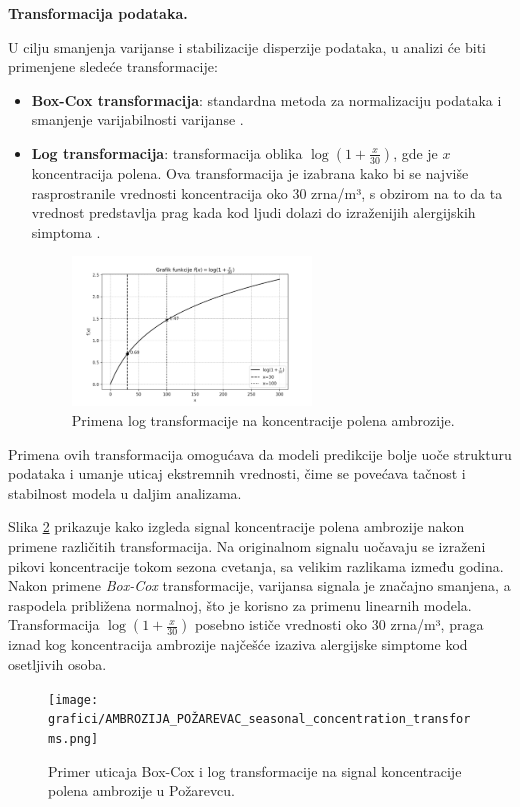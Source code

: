 \documentclass[12pt]{article}
\begin{document}
\bigskip

\textbf{Transformacija podataka.}

U cilju smanjenja varijanse i stabilizacije disperzije podataka, u analizi će biti primenjene sledeće transformacije:

\begin{itemize}
    \item \textbf{Box-Cox transformacija}: standardna metoda za normalizaciju podataka i smanjenje varijabilnosti varijanse \cite{boxcox1964}.
    \item \textbf{Log transformacija}: transformacija oblika $\log(1 + \frac{x}{30})$, gde je $x$ koncentracija polena. Ova transformacija je izabrana kako bi se najviše rasprostranile vrednosti koncentracija oko 30 zrna/m³, s obzirom na to da ta vrednost predstavlja prag kada kod ljudi dolazi do izraženijih alergijskih simptoma \cite{damato2007}.
    \begin{figure}[H]
        \centering
        \includegraphics[width=0.6\textwidth]{grafici/log1p.png}
        \caption{Primena log transformacije na koncentracije polena ambrozije.}
        \label{fig:log_transform}
    \end{figure}
    
\end{itemize}

Primena ovih transformacija omogućava da modeli predikcije bolje uoče strukturu podataka i umanje uticaj ekstremnih vrednosti, čime se povećava tačnost i stabilnost modela u daljim analizama.

Slika \ref{fig:ambrozija_transforms} prikazuje kako izgleda signal koncentracije polena ambrozije nakon primene različitih transformacija. Na originalnom signalu uočavaju se izraženi pikovi koncentracije tokom sezona cvetanja, sa velikim razlikama između godina. Nakon primene \textit{Box-Cox} transformacije, varijansa signala je značajno smanjena, a raspodela približena normalnoj, što je korisno za primenu linearnih modela. Transformacija $\log(1 + \frac{x}{30})$ posebno ističe vrednosti oko 30 zrna/m³, praga iznad kog koncentracija ambrozije najčešće izaziva alergijske simptome kod osetljivih osoba.
\begin{figure}[H]
    \centering
    \texttt{[image: grafici/AMBROZIJA\_POŽAREVAC\_seasonal\_concentration\_transforms.png]}
    \caption{Primer uticaja Box-Cox i log transformacije na signal koncentracije polena ambrozije u Požarevcu.}
    \label{fig:ambrozija_transforms}
\end{figure}
\end{document}

